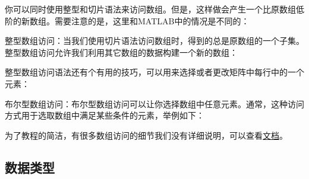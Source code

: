 



你可以同时使用整型和切片语法来访问数组。但是，这样做会产生一个比原数组低阶的新数组。需要注意的是，这里和MATLAB中的情况是不同的：






整型数组访问：当我们使用切片语法访问数组时，得到的总是原数组的一个子集。整型数组访问允许我们利用其它数组的数据构建一个新的数组：





整型数组访问语法还有个有用的技巧，可以用来选择或者更改矩阵中每行中的一个元素：




布尔型数组访问：布尔型数组访问可以让你选择数组中任意元素。通常，这种访问方式用于选取数组中满足某些条件的元素，举例如下：



为了教程的简洁，有很多数组访问的细节我们没有详细说明，可以查看\href{http://docs.scipy.org/doc/numpy/reference/arrays.indexing.html}{文档}。

\subsection{数据类型}


